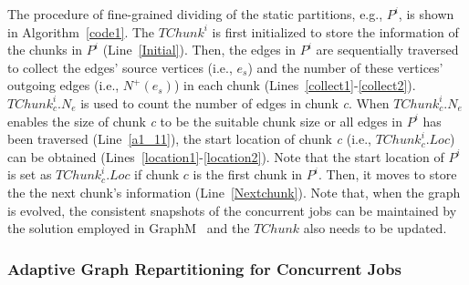 \documentclass[10pt,journal,compsoc]{IEEEtran}
\begin{document}
The procedure of fine-grained dividing of the static partitions, e.g., $P^i$, is shown in Algorithm~\ref{code1}. The $TChunk^i$ is first initialized to store the information of the chunks in $P^i$ (Line~\ref{Initial}). Then, the edges in $P^i$ are sequentially traversed to collect the edges' source vertices (i.e., $e_s$) and the number of these vertices' outgoing edges (i.e., $N^+(e_s)$) in each chunk (Lines~\ref{collect1}-\ref{collect2}). $TChunk^i_c.N_e$ is used to count the number of edges in chunk \textit{c}. When $TChunk^i_c.N_e$ enables the size of chunk \textit{c} to be the suitable chunk size or all edges in $P^i$ has been traversed (Line~\ref{a1_11}), the start location of chunk \textit{c} (i.e., $TChunk^i_c.Loc$) can be obtained (Lines~\ref{location1}-\ref{location2}). Note that the start location of $P^i$ is set as $TChunk^i_c.Loc$ if chunk $c$ is the first chunk in $P^i$. Then, it moves to store the the next chunk's information (Line~\ref{Nextchunk}). Note that, when the graph is evolved, the consistent snapshots of the concurrent jobs can be maintained by the solution employed in GraphM~\cite{GraphM} and the $TChunk$ also needs to be updated.

\vspace{-6pt}
\subsubsection{Adaptive Graph Repartitioning for Concurrent Jobs}%

\end{document}
